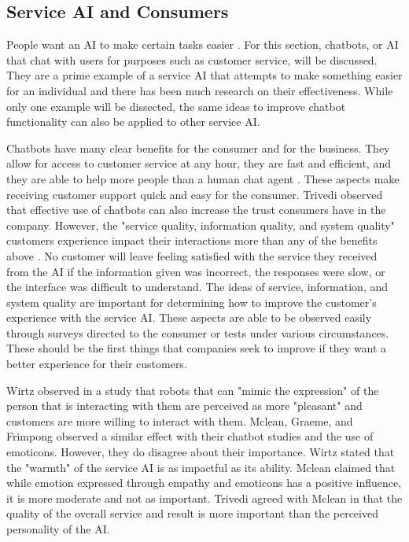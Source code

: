 \documentclass[12pt, man]{apa6}
\begin{document}
\subsection*{Service AI and Consumers}
People want an AI to make certain tasks easier \parencite{Trivedi201991}.  For this section, chatbots, or AI that chat with users for purposes such as customer service, will be discussed.  They are a prime example of a service AI that attempts to make something easier for an individual and there has been much research on their effectiveness.  While only one example will be dissected, the same ideas to improve chatbot functionality can also be applied to other service AI.

Chatbots have many clear benefits for the consumer and for the business.  They allow for access to customer service at any hour, they are fast and efficient, and they are able to help more people than a human chat agent \parencite{McLean2017494}. These aspects make receiving customer support quick and easy for the consumer.  Trivedi \parencite*{Trivedi201991} observed that effective use of chatbots can also increase the trust consumers have in the company.  However, the "service quality, information quality, and system quality" customers experience impact their interactions more than any of the benefits above \parencite{McLean2017494}.  No customer will leave feeling satisfied with the service they received from the AI if the information given was incorrect, the responses were slow, or the interface was difficult to understand.  The ideas of service, information, and system quality are important for determining how to improve the customer's experience with the service AI.  These aspects are able to be observed easily through surveys directed to the consumer or tests under various circumstances.  These should be the first things that companies seek to improve if they want a better experience for their customers.

Wirtz \parencite*{Wirtz2018} observed in a study that robots that can "mimic the expression" of the person that is interacting with them are perceived as more "pleasant" and customers are more willing to interact with them.  Mclean, Graeme, and Frimpong \parencite*{McLean2017494} observed a similar effect with their chatbot studies and the use of emoticons.  However, they do disagree about their importance.  Wirtz \parencite*[]{Wirtz2018} stated that the "warmth" of the service AI is as impactful as its ability.  Mclean \parencite*[]{Wirtz2018} claimed that while emotion expressed through empathy and emoticons has a positive influence, it is more moderate and not as important.  Trivedi \parencite*{Trivedi201991} agreed with Mclean in that the quality of the overall service and result is more important than the perceived personality of the AI.
\end{document}
